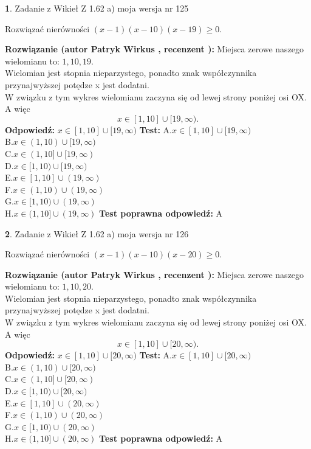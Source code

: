 \documentclass[12pt, a4paper]{article}
\theoremstyle{definition} %
\newtheorem{zad}{}
\newcommand{\zadStart}[1]{\begin{zad}#1\newline}
\newcommand{\zadStop}{\end{zad}}
\newcommand{\rozwStart}[2]{\noindent \textbf{Rozwiązanie (autor #1 , recenzent #2): }\newline}
\newcommand{\rozwStop}{\newline}
\newcommand{\odpStart}{\noindent \textbf{Odpowiedź:}\newline}
\newcommand{\odpStop}{\newline}
\newcommand{\testStart}{\noindent \textbf{Test:}\newline}
\newcommand{\testStop}{\newline}
\newcommand{\kluczStart}{\noindent \textbf{Test poprawna odpowiedź:}\newline}
\newcommand{\kluczStop}{\newline}
\begin{document}
\zadStart{Zadanie z Wikieł Z 1.62 a) moja wersja nr 125}

Rozwiązać nierówności $(x-1)(x-10)(x-19)\ge0$.
\zadStop
\rozwStart{Patryk Wirkus}{}
Miejsca zerowe naszego wielomianu to: $1, 10, 19$.\\
Wielomian jest stopnia nieparzystego, ponadto znak współczynnika przy\linebreak najwyższej potędze x jest dodatni.\\ W związku z tym wykres wielomianu zaczyna się od lewej strony poniżej osi OX. A więc $$x \in [1,10] \cup [19,\infty).$$
\rozwStop
\odpStart
$x \in [1,10] \cup [19,\infty)$
\odpStop
\testStart
A.$x \in [1,10] \cup [19,\infty)$\\
B.$x \in (1,10) \cup [19,\infty)$\\
C.$x \in (1,10] \cup [19,\infty)$\\
D.$x \in [1,10) \cup [19,\infty)$\\
E.$x \in [1,10] \cup (19,\infty)$\\
F.$x \in (1,10) \cup (19,\infty)$\\
G.$x \in [1,10) \cup (19,\infty)$\\
H.$x \in (1,10] \cup (19,\infty)$
\testStop
\kluczStart
A
\kluczStop



\zadStart{Zadanie z Wikieł Z 1.62 a) moja wersja nr 126}

Rozwiązać nierówności $(x-1)(x-10)(x-20)\ge0$.
\zadStop
\rozwStart{Patryk Wirkus}{}
Miejsca zerowe naszego wielomianu to: $1, 10, 20$.\\
Wielomian jest stopnia nieparzystego, ponadto znak współczynnika przy\linebreak najwyższej potędze x jest dodatni.\\ W związku z tym wykres wielomianu zaczyna się od lewej strony poniżej osi OX. A więc $$x \in [1,10] \cup [20,\infty).$$
\rozwStop
\odpStart
$x \in [1,10] \cup [20,\infty)$
\odpStop
\testStart
A.$x \in [1,10] \cup [20,\infty)$\\
B.$x \in (1,10) \cup [20,\infty)$\\
C.$x \in (1,10] \cup [20,\infty)$\\
D.$x \in [1,10) \cup [20,\infty)$\\
E.$x \in [1,10] \cup (20,\infty)$\\
F.$x \in (1,10) \cup (20,\infty)$\\
G.$x \in [1,10) \cup (20,\infty)$\\
H.$x \in (1,10] \cup (20,\infty)$
\testStop
\kluczStart
A
\kluczStop
\end{document}
